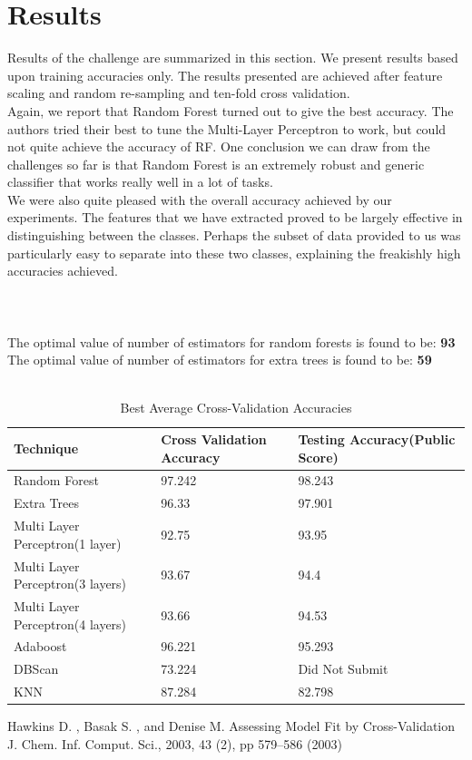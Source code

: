 \documentclass{llncs}
\begin{document}
\section{Results}
Results of the challenge are summarized in this section. We present results based upon training accuracies only. The results presented are achieved after feature scaling and random re-sampling and ten-fold cross validation. \\
Again, we report that Random Forest turned out to give the best accuracy. The authors tried their best to tune the Multi-Layer Perceptron to work, but could not quite achieve the accuracy of RF. One conclusion we can draw from the challenges so far is that Random Forest is an extremely robust and generic classifier that works really well in a lot of tasks. \\
We were also quite pleased with the overall accuracy achieved by our experiments. The features that we have extracted proved to be largely effective in distinguishing between the classes. Perhaps the subset of data provided to us was particularly easy to separate into these two classes, explaining the freakishly high accuracies achieved. \\\\\\\\
The optimal value of number of estimators for random forests is found to be: \textbf{93}\\
The optimal value of number of estimators for extra trees is found to be: \textbf{59}\\\\

\begin{table}[h]
	\centering
	\caption{Best Average Cross-Validation Accuracies}
	\begin{tabular}{ |p{5cm}||p{3cm}||p{3cm}|}
		\hline
		Technique                  &Cross Validation Accuracy & Testing Accuracy(Public Score)\\
		\hline
		Random Forest              								&97.242 &98.243\\
		Extra Trees													&96.33 & 97.901\\
		Multi Layer Perceptron(1 layer)	 			  		&92.75 &93.95\\
		Multi Layer Perceptron(3 layers)	 			  &93.67 &94.4\\
		Multi Layer Perceptron(4 layers)	 			  &93.66 &94.53\\
		Adaboost	 					            &96.221 &95.293\\
		DBScan	 						             &73.224 &Did Not Submit\\
		KNN              				               &87.284 &82.798\\

		 \hline
	\end{tabular}
	\label{table}
\end{table}


%
%
\begin{thebibliography}{5}
%

Hawkins D. , Basak S. , and Denise M. 
Assessing Model Fit by Cross-Validation
J. Chem. Inf. Comput. Sci., 2003, 43 (2), pp 579–586 (2003)

\end{thebibliography}
\end{document}

